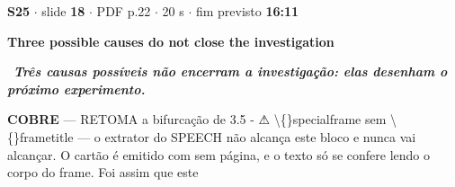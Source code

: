 \documentclass[11pt,a4paper]{article}
\begin{document}
\begin{tcolorbox}[breakable,colback=white,colframe=teal!55,boxrule=0.6pt,arc=2pt,left=3mm,right=3mm,top=2mm,bottom=2mm]
{\small\color{soft}\textbf{S25} $\cdot$ slide \textbf{18} $\cdot$ PDF p.22 $\cdot$ 20 s $\cdot$ fim previsto \textbf{16:11}}\par\vspace{1mm}
{\large\bfseries\color{ink} Three possible causes do not close the investigation}\par\vspace{2mm}
{\color{teal}\textbf{\textrightarrow}}\ \textbf{\itshape Três causas possíveis não encerram a investigação: elas desenham o próximo experimento.}\par\vspace{1.5mm}
{\small\color{teal}\textbf{COBRE} --- RETOMA a bifurcação de 3.5 - ⚠ \textbackslash\{\}specialframe sem \textbackslash\{\}frametitle --- o extrator do SPEECH não alcança este bloco e nunca vai alcançar. O cartão é emitido com sem página, e o texto só se confere lendo o corpo do frame. Foi assim que este}\par\vspace{1mm}
\par
{}
\end{tcolorbox}\vspace{2mm}
\par\vspace{2mm}
\end{document}
